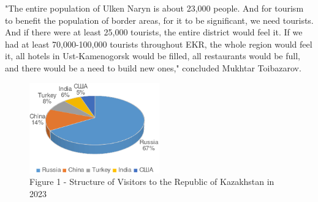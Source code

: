 \begin{multicols}{2}
"The entire population of Ulken Naryn is about 23,000 people. And for
tourism to benefit the population of border areas, for it to be
significant, we need tourists. And if there were at least 25,000
tourists, the entire district would feel it. If we had at least
70,000-100,000 tourists throughout EKR, the whole region would feel it,
all hotels in Ust-Kamenogorsk would be filled, all restaurants would be
full, and there would be a need to build new ones," concluded Mukhtar
Toibazarov.
\end{multicols}

\begin{figure}[H]
	\centering
	\includegraphics[width=0.5\textwidth]{assets/340.2}
	\caption*{Figure 1 - Structure of Visitors to the Republic of Kazakhstan in 2023}
\end{figure}

